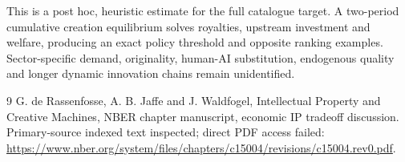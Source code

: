 \documentclass[11pt]{article}
\begin{document}
This is a post hoc, heuristic estimate for the full catalogue target.
A two-period cumulative creation equilibrium solves royalties, upstream investment and welfare, producing an exact policy threshold and opposite ranking examples. Sector-specific demand, originality, human-AI substitution, endogenous quality and longer dynamic innovation chains remain unidentified.

\begin{thebibliography}{9}
 G. de Rassenfosse, A. B. Jaffe and J. Waldfogel, Intellectual Property and Creative Machines, NBER chapter manuscript, economic IP tradeoff discussion. Primary-source indexed text inspected; direct PDF access failed:
\url{https://www.nber.org/system/files/chapters/c15004/revisions/c15004.rev0.pdf}.
\end{thebibliography}
\end{document}
